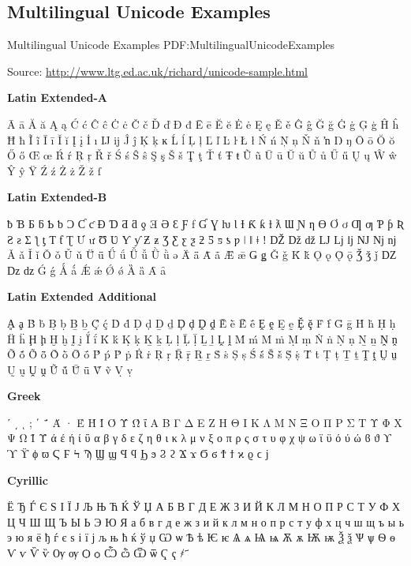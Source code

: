 \documentclass[a4paper,10pt,oneside]{article}
\begin{document}
\begin{body}

\section
{Multilingual Unicode Examples}
{Multilingual Unicode Examples}
{PDF:MultilingualUnicodeExamples}

Source:
\href{http://www.ltg.ed.ac.uk/~richard/unicode-sample.html}
{http://www.ltg.ed.ac.uk/{\TildeSymbol}richard/unicode-sample.html}

\EntryGapNoBreak
\textbf{Latin Extended-A}
\begin{detail}
Ā ā Ă ă Ą ą Ć ć Ĉ ĉ Ċ ċ Č č Ď ď Đ đ Ē ē Ĕ ĕ Ė ė Ę ę Ě ě Ĝ ĝ Ğ ğ Ġ ġ Ģ ģ Ĥ ĥ Ħ ħ Ĩ ĩ Ī ī Ĭ ĭ Į į İ ı Ĳ ĳ Ĵ ĵ Ķ ķ ĸ Ĺ ĺ Ļ ļ Ľ ľ Ŀ ŀ Ł ł Ń ń Ņ ņ Ň ň ŉ Ŋ ŋ Ō ō Ŏ ŏ Ő ő Œ œ Ŕ ŕ Ŗ ŗ Ř ř Ś ś Ŝ ŝ Ş ş Š š Ţ ţ Ť ť Ŧ ŧ Ũ ũ Ū ū Ŭ ŭ Ů ů Ű ű Ų ų Ŵ ŵ Ŷ ŷ Ÿ Ź ź Ż ż Ž ž ſ
\end{detail}

\EntryGap
\textbf{Latin Extended-B}
\begin{detail}
ƀ Ɓ Ƃ ƃ Ƅ ƅ Ɔ Ƈ ƈ Ɖ Ɗ Ƌ ƌ ƍ Ǝ Ə Ɛ Ƒ ƒ Ɠ Ɣ ƕ Ɩ Ɨ Ƙ ƙ ƚ ƛ Ɯ Ɲ ƞ Ɵ Ơ ơ Ƣ ƣ Ƥ ƥ Ʀ Ƨ ƨ Ʃ ƪ ƫ Ƭ ƭ Ʈ Ư ư Ʊ Ʋ Ƴ ƴ Ƶ ƶ Ʒ Ƹ ƹ ƺ ƻ Ƽ ƽ ƾ ƿ ǀ ǁ ǂ ǃ Ǆ ǅ ǆ Ǉ ǈ ǉ Ǌ ǋ ǌ Ǎ ǎ Ǐ ǐ Ǒ ǒ Ǔ ǔ Ǖ ǖ Ǘ ǘ Ǚ ǚ Ǜ ǜ ǝ Ǟ ǟ Ǡ ǡ Ǣ ǣ Ǥ ǥ Ǧ ǧ Ǩ ǩ Ǫ ǫ Ǭ ǭ Ǯ ǯ ǰ Ǳ ǲ ǳ Ǵ ǵ Ǻ ǻ Ǽ ǽ Ǿ ǿ Ȁ ȁ Ȃ ȃ
\end{detail}

\EntryGap
\textbf{Latin Extended Additional}
\begin{detail}
Ḁ ḁ Ḃ ḃ Ḅ ḅ Ḇ ḇ Ḉ ḉ Ḋ ḋ Ḍ ḍ Ḏ ḏ Ḑ ḑ Ḓ ḓ Ḕ ḕ Ḗ ḗ Ḙ ḙ Ḛ ḛ Ḝ ḝ Ḟ ḟ Ḡ ḡ Ḣ ḣ Ḥ ḥ Ḧ ḧ Ḩ ḩ Ḫ ḫ Ḭ ḭ Ḯ ḯ Ḱ ḱ Ḳ ḳ Ḵ ḵ Ḷ ḷ Ḹ ḹ Ḻ ḻ Ḽ ḽ Ḿ ḿ Ṁ ṁ Ṃ ṃ Ṅ ṅ Ṇ ṇ Ṉ ṉ Ṋ ṋ Ṍ ṍ Ṏ ṏ Ṑ ṑ Ṓ ṓ Ṕ ṕ Ṗ ṗ Ṙ ṙ Ṛ ṛ Ṝ ṝ Ṟ ṟ Ṡ ṡ Ṣ ṣ Ṥ ṥ Ṧ ṧ Ṩ ṩ Ṫ ṫ Ṭ ṭ Ṯ ṯ Ṱ ṱ Ṳ ṳ Ṵ ṵ Ṷ ṷ Ṹ ṹ Ṻ ṻ Ṽ ṽ Ṿ ṿ
\end{detail}

\EntryGap
\textbf{Greek}
\begin{detail}
ʹ ͵ ͺ ; ΄ ΅ Ά · Έ Ή Ί Ό Ύ Ώ ΐ Α Β Γ Δ Ε Ζ Η Θ Ι Κ Λ Μ Ν Ξ Ο Π Ρ Σ Τ Υ Φ Χ Ψ Ω Ϊ Ϋ ά έ ή ί ΰ α β γ δ ε ζ η θ ι κ λ μ ν ξ ο π ρ ς σ τ υ φ χ ψ ω ϊ ϋ ό ύ ώ ϐ ϑ ϒ ϓ ϔ ϕ ϖ Ϛ Ϝ Ϟ Ϡ Ϣ ϣ Ϥ ϥ Ϧ ϧ Ϩ ϩ Ϫ ϫ Ϭ ϭ Ϯ ϯ ϰ ϱ ϲ ϳ
\end{detail}

\EntryGap
\textbf{Cyrillic}
\begin{detail}
Ё Ђ Ѓ Є Ѕ І Ї Ј Љ Њ Ћ Ќ Ў Џ А Б В Г Д Е Ж З И Й К Л М Н О П Р С Т У Ф Х Ц Ч Ш Щ Ъ Ы Ь Э Ю Я а б в г д е ж з и й к л м н о п р с т у ф х ц ч ш щ ъ ы ь э ю я ё ђ ѓ є ѕ і ї ј љ њ ћ ќ ў џ Ѡ ѡ Ѣ ѣ Ѥ ѥ Ѧ ѧ Ѩ ѩ Ѫ ѫ Ѭ ѭ Ѯ ѯ Ѱ ѱ Ѳ ѳ Ѵ ѵ Ѷ ѷ Ѹ ѹ Ѻ ѻ Ѽ ѽ Ѿ ѿ Ҁ ҁ ҂ ҃
\end{detail}


\end{body}
\end{document}
